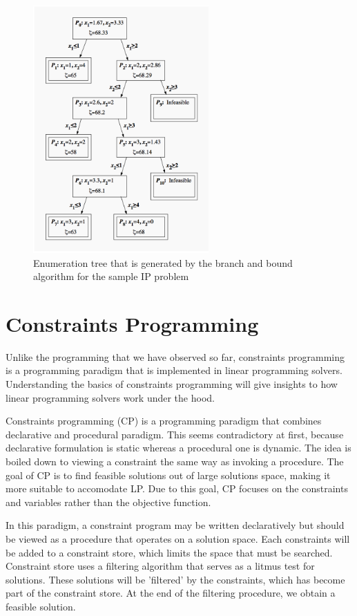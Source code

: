 \documentclass[a4paper, 12pt]{report}
\begin{document}
\begin{figure}[!ht]
  \centering
    \includegraphics[width=0.6\textwidth]{BNB.png}
    \caption{Enumeration tree that is generated by the branch and bound algorithm for the sample IP problem}
\end{figure}

\section{Constraints Programming}
Unlike the programming that we have observed so far, constraints programming is a programming paradigm that is implemented
in linear programming solvers. Understanding the basics of constraints programming will give insights to how linear programming
solvers work under the hood.

Constraints programming (CP) is a programming paradigm that combines declarative and procedural paradigm. This seems contradictory
at first, because declarative formulation is static whereas a procedural one is dynamic. The idea is boiled down to viewing
a constraint the same way as invoking a procedure. The goal of CP is to find feasible solutions out of large solutions space, making it
more suitable to accomodate LP. Due to this goal, CP focuses on the constraints and variables rather than the objective function.

In this paradigm, a constraint program may be written declaratively but should be viewed as a procedure that operates on a
solution space. Each constraints will be added to a constraint store, which limits the space that must be searched.
Constraint store uses a filtering algorithm that serves as a litmus test for solutions. These solutions will be 'filtered'
by the constraints, which has become part of the constraint store. At the end of the filtering procedure, we obtain a feasible solution.
\end{document}
